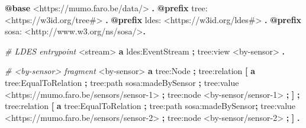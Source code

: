 \documentclass{ceurart}
\newenvironment{Shaded}{\begin{snugshade}}{\end{snugshade}}
\newcommand{\KeywordTok}[1]{\textcolor[rgb]{0.13,0.29,0.53}{\textbf{#1}}}
\newcommand{\VariableTok}[1]{\textcolor[rgb]{0.00,0.00,0.81}{#1}}
\newcommand{\StringTok}[1]{\textcolor[rgb]{0.31,0.60,0.02}{#1}}
\newcommand{\CommentTok}[1]{\textcolor[rgb]{0.56,0.35,0.01}{\textit{#1}}}
\newcommand{\FunctionTok}[1]{\textcolor[rgb]{0.00,0.00,0.00}{#1}}
\newcommand{\OperatorTok}[1]{\textcolor[rgb]{0.81,0.36,0.00}{\textbf{#1}}}
\newcommand{\NormalTok}[1]{#1}
\begin{document}
\begin{listing}
\begin{Shaded}
\begin{Highlighting}[]
\KeywordTok{@base}\NormalTok{ }\StringTok{<https://mumo.faro.be/data/>}\NormalTok{ }\OperatorTok{.}
\KeywordTok{@prefix}\NormalTok{ }\VariableTok{tree:}\NormalTok{ }\StringTok{<https://w3id.org/tree\#>}\NormalTok{ }\OperatorTok{.}
\KeywordTok{@prefix}\NormalTok{ }\VariableTok{ldes:}\NormalTok{ }\StringTok{<https://w3id.org/ldes\#>}\NormalTok{ }\OperatorTok{.}
\KeywordTok{@prefix}\NormalTok{ }\VariableTok{sosa:}\NormalTok{ }\StringTok{<http://www.w3.org/ns/sosa/>}\OperatorTok{.}

\CommentTok{\# LDES entrypoint}
\StringTok{<stream>}
\NormalTok{  }\KeywordTok{a}\NormalTok{ }\VariableTok{ldes:}\FunctionTok{EventStream}\NormalTok{ }\OperatorTok{;}
\NormalTok{  }\VariableTok{tree:}\FunctionTok{view}\NormalTok{ }\StringTok{<by-sensor>}\NormalTok{ }\OperatorTok{.}

\CommentTok{\# <by-sensor> fragment}
\StringTok{<by-sensor>}
\NormalTok{  }\KeywordTok{a}\NormalTok{ }\VariableTok{tree:}\FunctionTok{Node}\NormalTok{ }\OperatorTok{;}
\NormalTok{  }\VariableTok{tree:}\FunctionTok{relation}\NormalTok{ }\OperatorTok{[}
\NormalTok{    }\KeywordTok{a}\NormalTok{ }\VariableTok{tree:}\FunctionTok{EqualToRelation}\NormalTok{ }\OperatorTok{;}
\NormalTok{    }\VariableTok{tree:}\FunctionTok{path}\NormalTok{ }\VariableTok{sosa:}\FunctionTok{madeBySensor}\NormalTok{ }\OperatorTok{;}
\NormalTok{    }\VariableTok{tree:}\FunctionTok{value}\NormalTok{ }\StringTok{<https://mumo.faro.be/sensors/sensor-1>}\NormalTok{ }\OperatorTok{;}
\NormalTok{    }\VariableTok{tree:}\FunctionTok{node}\NormalTok{ }\StringTok{<by-sensor/sensor-1>}\NormalTok{ }\OperatorTok{;}
\NormalTok{  }\OperatorTok{]}\NormalTok{ }\OperatorTok{;}
\NormalTok{  }\VariableTok{tree:}\FunctionTok{relation}\NormalTok{ }\OperatorTok{[}
\NormalTok{    }\KeywordTok{a}\NormalTok{ }\VariableTok{tree:}\FunctionTok{EqualToRelation}\NormalTok{ }\OperatorTok{;}
\NormalTok{    }\VariableTok{tree:}\FunctionTok{path}\NormalTok{ }\VariableTok{sosa:}\FunctionTok{madeBySensor}\OperatorTok{;}
\NormalTok{    }\VariableTok{tree:}\FunctionTok{value}\NormalTok{ }\StringTok{<https://mumo.faro.be/sensors/sensor-2>}\NormalTok{ }\OperatorTok{;}
\NormalTok{    }\VariableTok{tree:}\FunctionTok{node}\NormalTok{ }\StringTok{<by-sensor/sensor-2>}\NormalTok{ }\OperatorTok{;}
\NormalTok{  }\OperatorTok{]}\NormalTok{ }\OperatorTok{.}
\end{Highlighting}
\end{Shaded}

\centering
\caption{LDES fragmentation overview example, first fragmenting on location, then on group and lastly on time.}
\label{list:relation}
\end{listing}
\end{document}
